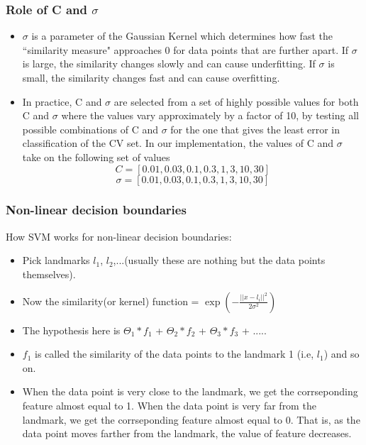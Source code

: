 \documentclass[11pt,xcolor=dvipsnames]{beamer}
\begin{document}
\begin{frame}
\frametitle{Role of C and $\sigma$}
\begin{itemize}
\item $\sigma$ is a parameter of the Gaussian Kernel which determines how fast the ``similarity measure" approaches 0 for data points that are further apart. If $\sigma$ is large, the similarity changes slowly and can cause underfitting. If $\sigma$ is small, the similarity changes fast and can cause overfitting.\\
\item In practice, C and $\sigma$ are selected from a set of highly possible values for both C and $\sigma$ where the values vary approximately by a factor of 10, by testing all possible combinations of C and $\sigma$ for the one that gives the least error in classification of the CV set. In our implementation, the values of C and $\sigma$ take on the following set of values
\begin{displaymath}C = [0.01, 0.03, 0.1, 0.3, 1, 3, 10, 30]\end{displaymath}
\begin{displaymath}\sigma = [0.01, 0.03, 0.1, 0.3, 1, 3, 10, 30]\end{displaymath}
\end{itemize}
\end{frame}


\begin{frame}
\frametitle{Non-linear decision boundaries}
How SVM works for non-linear decision boundaries:\\
\begin{itemize}
\item Pick landmarks $l_1$, $l_2$,...(usually these are nothing but the data points themselves).\\
\item Now the similarity(or kernel) function = $\exp(-\frac{||x - l_i||^2}{2\sigma^2})$
\item The hypothesis here is $\Theta_1*f_1$ + $\Theta_2*f_2$ + $\Theta_3*f_3$ + .....\\
\item $f_1$ is called the similarity of the data points to the landmark 1 (i.e, $l_1$) and so on.\\
\item When the data point is very close to the landmark, we get the corrseponding feature almost equal to 1. When the data point is very far from the landmark, we get the corrseponding feature almost equal to 0. That is, as the data point moves farther from the landmark, the value of feature decreases.
\end{itemize}
\end{frame}
\end{document}
